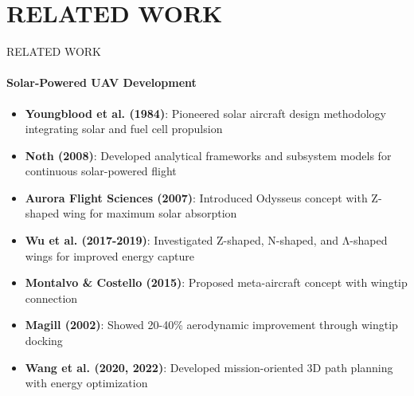 \documentclass{beamer}
\begin{document}
	\section{RELATED WORK}
\begin{frame}{RELATED WORK}
    \framesubtitle{Solar-Powered UAV Development}
    \begin{itemize}
        \item \textbf{Youngblood et al. (1984)}: Pioneered solar aircraft design methodology integrating solar and fuel cell propulsion
        \item \textbf{Noth (2008)}: Developed analytical frameworks and subsystem models for continuous solar-powered flight
        \item \textbf{Aurora Flight Sciences (2007)}: Introduced Odysseus concept with Z-shaped wing for maximum solar absorption
        \item \textbf{Wu et al. (2017-2019)}: Investigated Z-shaped, N-shaped, and Λ-shaped wings for improved energy capture
        \item \textbf{Montalvo \& Costello (2015)}: Proposed meta-aircraft concept with wingtip connection
        \item \textbf{Magill (2002)}: Showed 20-40\% aerodynamic improvement through wingtip docking
        \item \textbf{Wang et al. (2020, 2022)}: Developed mission-oriented 3D path planning with energy optimization
    \end{itemize}
\end{frame}
\end{document}
